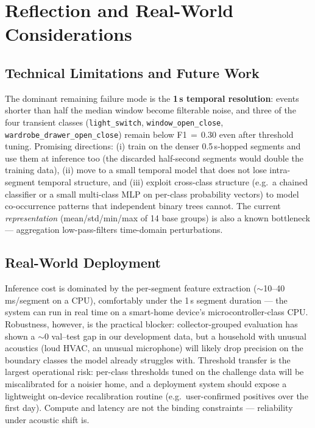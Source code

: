 \documentclass{article}
\begin{document}
\section{Reflection and Real-World Considerations}
\label{sec:reflection}

\subsection{Technical Limitations and Future Work}
The dominant remaining failure mode is the \textbf{1\,s temporal
resolution}: events shorter than half the median window become
filterable noise, and three of the four transient classes
(\texttt{light\_switch}, \texttt{window\_open\_close},
\texttt{wardrobe\_drawer\_open\_close}) remain below F1$\,{=}\,0.30$
even after threshold tuning. Promising directions: (i) train on the
denser 0.5\,s-hopped segments and use them at inference too (the
discarded half-second segments would double the training data), (ii)
move to a small temporal model  that does not lose intra-segment temporal structure, and (iii)
exploit cross-class structure (e.g.\ a chained classifier or a small
multi-class MLP on per-class probability vectors) to model co-occurrence
patterns that independent binary trees cannot. The current
\emph{representation} (mean/std/min/max of 14 base groups) is also a
known bottleneck --- aggregation low-pass-filters time-domain
perturbations.

\subsection{Real-World Deployment}
Inference cost is dominated by the per-segment feature extraction
($\sim$10--40\,ms/segment on a CPU), comfortably under the 1\,s segment
duration --- the system can run in real time on a smart-home device's
microcontroller-class CPU. Robustness, however, is the practical
blocker: collector-grouped evaluation has shown a $\sim$0 val--test gap
in our development data, but a household with unusual acoustics (loud
HVAC, an unusual microphone) will likely drop precision on the
boundary classes the model already struggles with. Threshold transfer
is the largest operational risk: per-class thresholds tuned on the
challenge data will be miscalibrated for a noisier home, and a
deployment system should expose a lightweight on-device recalibration
routine (e.g.\ user-confirmed positives over the first day). Compute
and latency are not the binding constraints --- reliability under
acoustic shift is.
\end{document}
